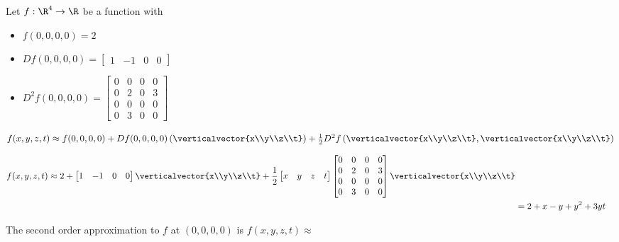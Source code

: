 \documentclass{ximera}
\begin{document}
	\begin{question}
		Let $f:\R^4 \to \R$ be a function with 
			\begin{itemize}
				\item $f(0,0,0,0) = 2$
				\item \(Df(0,0,0,0) = \begin{bmatrix} 1 & -1 & 0&0\end{bmatrix}\)
				\item \( D^2f(0,0,0,0) = \begin{bmatrix} 0&0&0&0 \\ 0&2&0&3 \\ 0&0&0&0\\0&3&0&0\end{bmatrix}\)
			\end{itemize}
			\begin{solution}
				\begin{hint}
					$f(x,y,z,t) \approx f(0,0,0,0)+ Df(0,0,0,0)\left(\verticalvector{x\\y\\z\\t}\right)+ \frac{1}{2}D^2f\left(\verticalvector{x\\y\\z\\t},\verticalvector{x\\y\\z\\t}\right)$
				\end{hint}
				\begin{hint}
					\begin{align*}
					f(x,y,z,t) \approx 2+ \begin{bmatrix} 1 & -1 & 0&0\end{bmatrix}\verticalvector{x\\y\\z\\t}+ 
					\frac{1}{2}\begin{bmatrix} x&y&z&t\end{bmatrix}\begin{bmatrix} 0&0&0&0 \\ 0&2&0&3 \\ 0&0&0&0\\0&3&0&0\end{bmatrix}\verticalvector{x\\y\\z\\t}\\
					&= 2+x-y+y^2+3yt
					\end{align*}
				\end{hint}
				The second order approximation to $f$ at $(0,0,0,0)$ is $f(x,y,z,t) \approx$ 
			\end{solution}
	\end{question}
\end{document}
